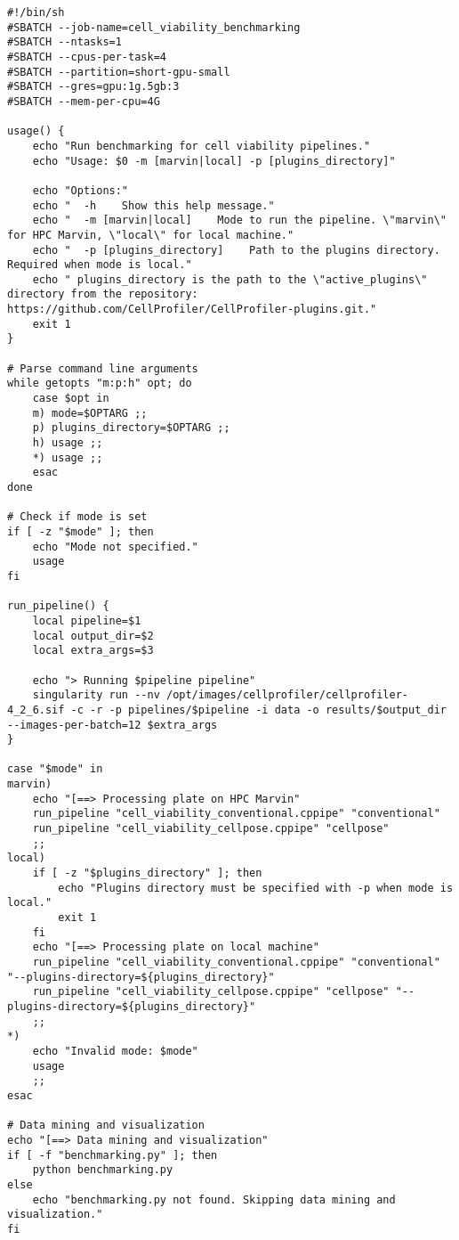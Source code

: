 \documentclass[a4paper, 12pt]{article}
\begin{document}
\begin{verbatim}
#!/bin/sh
#SBATCH --job-name=cell_viability_benchmarking
#SBATCH --ntasks=1
#SBATCH --cpus-per-task=4
#SBATCH --partition=short-gpu-small
#SBATCH --gres=gpu:1g.5gb:3
#SBATCH --mem-per-cpu=4G

usage() {
    echo "Run benchmarking for cell viability pipelines."
    echo "Usage: $0 -m [marvin|local] -p [plugins_directory]"

    echo "Options:"
    echo "  -h    Show this help message."
    echo "  -m [marvin|local]    Mode to run the pipeline. \"marvin\" for HPC Marvin, \"local\" for local machine."
    echo "  -p [plugins_directory]    Path to the plugins directory. Required when mode is local."
    echo " plugins_directory is the path to the \"active_plugins\" directory from the repository: https://github.com/CellProfiler/CellProfiler-plugins.git."
    exit 1
}

# Parse command line arguments
while getopts "m:p:h" opt; do
    case $opt in
    m) mode=$OPTARG ;;
    p) plugins_directory=$OPTARG ;;
    h) usage ;;
    *) usage ;;
    esac
done

# Check if mode is set
if [ -z "$mode" ]; then
    echo "Mode not specified."
    usage
fi

run_pipeline() {
    local pipeline=$1
    local output_dir=$2
    local extra_args=$3

    echo "> Running $pipeline pipeline"
    singularity run --nv /opt/images/cellprofiler/cellprofiler-4_2_6.sif -c -r -p pipelines/$pipeline -i data -o results/$output_dir --images-per-batch=12 $extra_args
}

case "$mode" in
marvin)
    echo "[==> Processing plate on HPC Marvin"
    run_pipeline "cell_viability_conventional.cppipe" "conventional"
    run_pipeline "cell_viability_cellpose.cppipe" "cellpose"
    ;;
local)
    if [ -z "$plugins_directory" ]; then
        echo "Plugins directory must be specified with -p when mode is local."
        exit 1
    fi
    echo "[==> Processing plate on local machine"
    run_pipeline "cell_viability_conventional.cppipe" "conventional" "--plugins-directory=${plugins_directory}"
    run_pipeline "cell_viability_cellpose.cppipe" "cellpose" "--plugins-directory=${plugins_directory}"
    ;;
*)
    echo "Invalid mode: $mode"
    usage
    ;;
esac

# Data mining and visualization
echo "[==> Data mining and visualization"
if [ -f "benchmarking.py" ]; then
    python benchmarking.py
else
    echo "benchmarking.py not found. Skipping data mining and visualization."
fi
\end{verbatim}
\end{document}
